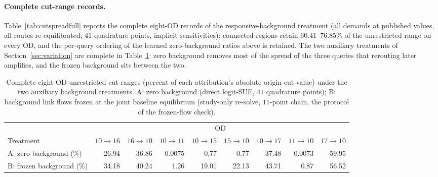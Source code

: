 \paragraph{Complete cut-range records.}
Table~\ref{tab:cutspreadfull} reports the complete eight-OD records of
the responsive-background treatment (all demands at published values,
all routes re-equilibrated; $41$ quadrature points, implicit
sensitivities): connected regions retain $60.41$--$76.85\%$ of the
unrestricted range on every OD, and the per-query ordering of the
learned zero-background ratios above is retained. The two auxiliary
treatments of Section~\ref{sec:variation} are complete in
Table~\ref{tab:bgfull}: zero background removes most of the spread of
the three queries that rerouting later amplifies, and the frozen
background sits between the two.
\begin{table}[pos=htbp]\centering\footnotesize
\caption{Complete eight-OD unrestricted cut ranges (percent of each
attribution's absolute origin-cut value) under the two auxiliary
background treatments. A: zero background (direct logit-SUE, $41$
quadrature points); B: background link flows frozen at the joint
baseline equilibrium (study-only re-solve, $11$-point chain, the
protocol of the frozen-flow check).}\label{tab:bgfull}
\small
\begin{tabular*}{\tblwidth}{@{\extracolsep{\fill}}lrrrrrrrr}
\toprule
& \multicolumn{8}{c}{OD}\\
\cmidrule(lr){2-9}
Treatment & $10{\to}16$ & $16{\to}10$ & $10{\to}11$ & $10{\to}15$ & $15{\to}10$ & $10{\to}17$ & $11{\to}10$ & $17{\to}10$\\
\midrule
A: zero background (\%) & 26.94 & 36.86 & 0.0075 & 0.77 & 0.77 & 37.48 & 0.0073 & 59.95 \\
B: frozen background (\%) & 34.18 & 40.24 & 1.26 & 19.01 & 22.13 & 43.71 & 0.87 & 56.52 \\
\bottomrule
\end{tabular*}
\end{table}
